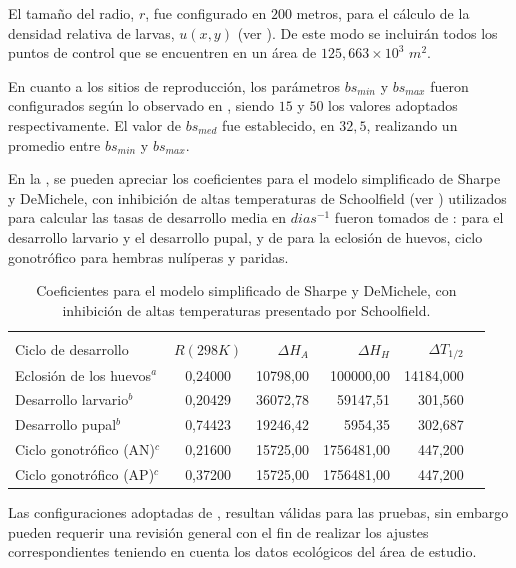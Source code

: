 El tamaño del radio, $r$, fue configurado en $200$ metros, para el cálculo de la densidad relativa
de larvas, $u(x,y)$ (ver ). De este modo se incluirán todos los
puntos de control que se encuentren en un área de $125,663 \times 10^{3}$ $m^{2}$.

En cuanto a los sitios de reproducción, los parámetros $bs_{min}$ y $bs_{max}$ fueron
configurados según lo observado en \cite{otero2006stochastic, otero2008stochastic}, siendo $15$ y
$50$ los valores adoptados respectivamente.  El valor de $bs_{med}$ fue establecido, en $32,5$,
realizando un promedio entre $bs_{min}$ y $bs_{max}$.

En la , se pueden apreciar los coeficientes para el modelo
simplificado de Sharpe y DeMichele, con inhibición de altas temperaturas de Schoolfield (ver
) utilizados para calcular las tasas de desarrollo media
en $dias^{-1}$ fueron tomados de : \cite{rueda1990temperature} para el desarrollo larvario y el
desarrollo pupal, y de \cite{otero2006stochastic} para la eclosión de huevos, ciclo gonotrófico para hembras nulíperas y paridas.

\begin{table}[!htpb]
\begin{minipage}{\textwidth}
    \centering
    \caption{ \label{tab:coef-sharpe-demichele} Coeficientes para el modelo simplificado de Sharpe y DeMichele, con inhibición de altas temperaturas presentado por Schoolfield.}
    \begin{tabular}{p{6cm} c r r r r }
        \hline \\
        Ciclo de desarrollo    & $R(298K)$ & $\Delta H_{A}$ & $\Delta H_{H}$ & $\Delta T_{1/2}$  \\
        \hline
        \hline
        Eclosión de los huevos$^a$ & 0,24000 & 10798,00 &  100000,00  & 14184,000\\
        Desarrollo larvario$^b$    & 0,20429 & 36072,78 &   59147,51  &   301,560\\
        Desarrollo pupal$^b$       & 0,74423 & 19246,42 &    5954,35  &   302,687\\
        Ciclo gonotrófico (AN)$^c$ & 0,21600 & 15725,00 & 1756481,00  &   447,200\\
        Ciclo gonotrófico (AP)$^c$ & 0,37200 & 15725,00 & 1756481,00  &   447,200\\
    \end{tabular}
\end{minipage}
\end{table}

Las configuraciones adoptadas de
\cite{otero2006stochastic,otero2008stochastic,rueda1990temperature}, resultan válidas para las
pruebas, sin embargo pueden requerir una revisión general con el fin de realizar los ajustes
correspondientes teniendo en cuenta los datos ecológicos del área de estudio.

